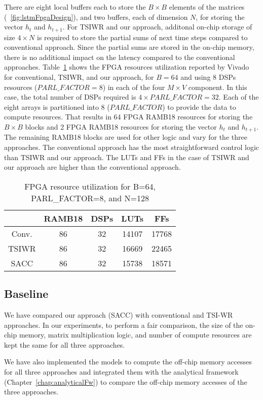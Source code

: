 {There are eight local buffers each to store the $B{\times}B$ elements of the matrices (\figurename{~\ref{fig:lstmFpgaDesign}}), and two buffers, each of dimension $N$, for storing the vector $h_t$ and $h_{t{+}1}$. For TSIWR and our approach, additonal on-chip storage of size $4{\times}N$ is required to store the partial sums of next time steps compared to conventional approach. Since the partial sums are stored in the on-chip memory, there is no additional impact on the latency compared to the conventional approaches. Table~\ref{tab:fpgaResources} shows the FPGA resources utilization reported by Vivado for conventional, TSIWR, and our approach, for $B{=}64$ and using 8 DSPs resources ($PARL\_FACTOR{=}8$) in each of the four $M{\times}V$ component. In this case, the total number of DSPs required is $4{\times}PARL\_FACTOR{=}32$.
Each of the eight arrays is partitioned into 8 ($PARL\_FACTOR$) to provide the data to compute resources. That results in 64 FPGA RAMB18 resources for storing the $B{\times}B$ blocks and 2 FPGA RAMB18 resources for storing the vector $h_t$ and $h_{t{+}1}$. The remaining RAMB18 blocks are used for other logic and vary for the three approaches. The conventional approach has the most straightforward control logic than TSIWR and our approach. The LUTs and FFs in the case of TSIWR and our approach are higher than the conventional approach. 
\begin{table}[htb]
	\centering
	\caption{FPGA resource utilization for B=64, PARL\_FACTOR=8, and N=128 }
	\label{tab:fpgaResources}
	\begin{tabular}{ccccc}
		\hline
		& RAMB18 & DSPs & LUTs  & FFs   \\ \hline
		Conv. & 86     & 32   & 14107 & 17768 \\ \hline
		TSIWR & 86     & 32   & 16669 & 22465 \\ \hline
		SACC  & 86     & 32   & 15738 & 18571 \\ \hline
	\end{tabular}
\end{table}
\subsection{Baseline}
We have compared our approach (SACC) with conventional and TSI-WR~\cite{park2020time} approaches. In our experiments, to perform a fair comparison, the size of the on-chip memory, matrix multiplication logic, and number of compute resources are kept the same for all three approaches.

We have also implemented the models to compute the off-chip memory accesses for all three approaches and integrated them with the analytical framework (Chapter~\ref{chap:analyticalFw}) to compare the off-chip memory accesses of the three approaches.
}
